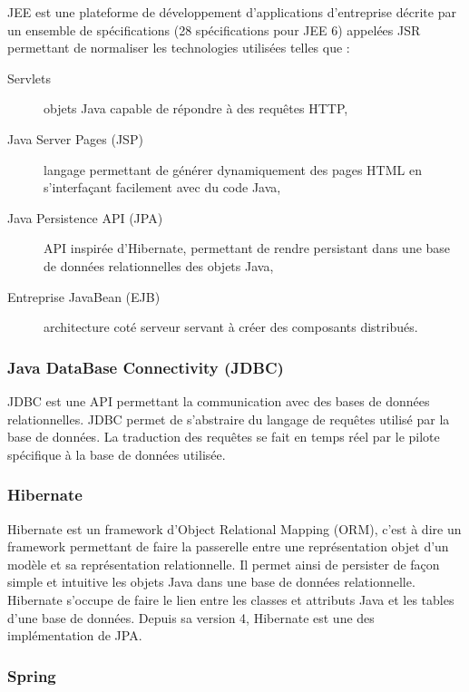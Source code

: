 JEE \cite{jee} est une plateforme de développement d'applications d'entreprise décrite par un ensemble de spécifications (28 spécifications pour JEE 6) appelées JSR permettant de normaliser les technologies utilisées telles que :

\begin{description}
	\item[Servlets] objets Java capable de répondre à des requêtes HTTP,
	\item[Java Server Pages (JSP)] langage permettant de générer dynamiquement des pages HTML en s'interfaçant facilement avec du code Java,
	\item[Java Persistence API (JPA)] API inspirée d'Hibernate, permettant de rendre persistant dans une base de données relationnelles des objets Java,
	\item[Entreprise JavaBean (EJB)] architecture coté serveur servant à créer des composants distribués.
\end{description}

\subsubsection{Java DataBase Connectivity (JDBC)}

JDBC \cite{jdbc} est une API permettant la communication avec des bases de données relationnelles. JDBC permet de s'abstraire du langage de requêtes utilisé par la base de données. La traduction des requêtes se fait en temps réel par le pilote spécifique à la base de données utilisée.

\subsubsection{Hibernate}

Hibernate \cite{hibernate} est un framework d'Object Relational Mapping (ORM), c'est à dire un framework permettant de faire la passerelle entre une représentation objet d'un modèle et sa représentation relationnelle. Il permet ainsi de persister de façon simple et intuitive les objets Java dans une base de données relationnelle. Hibernate s'occupe de faire le lien entre les classes et attributs Java et les tables d'une base de données. Depuis sa version 4, Hibernate est une des implémentation de JPA.

\subsubsection{Spring}

